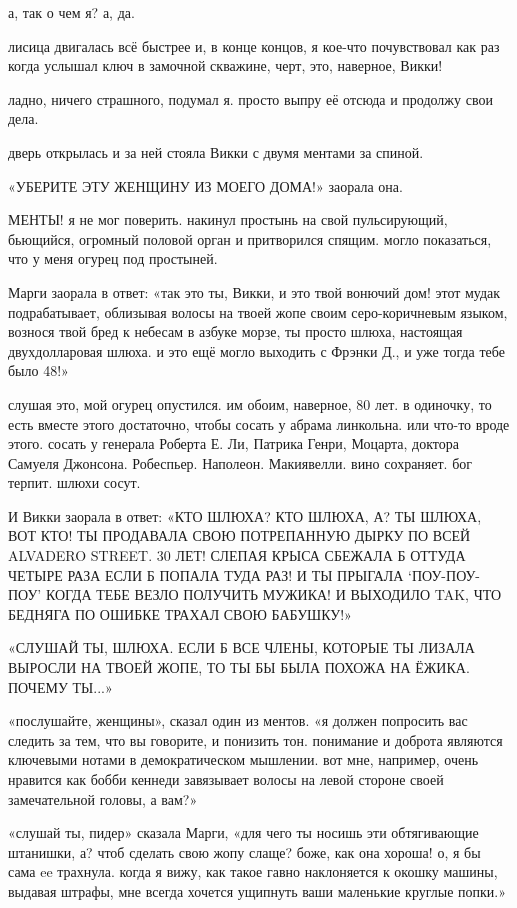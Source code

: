 а, так о чем я? а, да.

лисица двигалась всё быстрее и, в конце концов, я кое-что почувствовал как раз
когда услышал ключ в замочной скважине, черт, это, наверное, Викки!

ладно, ничего страшного, подумал я.
просто выпру её отсюда и продолжу свои дела.

дверь открылась и за ней стояла Викки с двумя ментами за спиной.

«УБЕРИТЕ ЭТУ ЖЕНЩИНУ ИЗ МОЕГО ДОМА!» заорала она.

МЕНТЫ! я не мог поверить.
накинул простынь на свой пульсирующий, бьющийся, 
огромный половой орган и притворился спящим.
могло показаться, что у меня 
огурец под простыней.

Марги заорала в ответ: «так это ты, Викки, и это твой вонючий дом! 
этот мудак подрабатывает, облизывая волосы на твоей жопе своим серо-коричневым 
языком, вознося твой бред к небесам в азбуке морзе, ты просто шлюха, 
настоящая двухдолларовая шлюха.
и это ещё могло выходить с Фрэнки Д., и уже 
тогда тебе было 48!»

слушая это, мой огурец опустился.
им обоим, наверное, 80 лет.
в одиночку, то 
есть вместе этого достаточно, чтобы сосать у абрама линкольна.
или что-то вроде этого.
сосать у генерала Роберта Е.
Ли, Патрика Генри, Моцарта, доктора Самуеля Джонсона.
Робеспьер.
Наполеон.
Макиявелли.
вино сохраняет.
бог терпит.
шлюхи сосут.

И Викки заорала в ответ: «КТО ШЛЮХА? КТО ШЛЮХА, А? ТЫ ШЛЮХА, ВОТ КТО! ТЫ
ПРОДАВАЛА СВОЮ ПОТРЕПАННУЮ ДЫРКУ ПО ВСЕЙ ALVADERO STREET.
30 ЛЕТ! СЛЕПАЯ КРЫСА
СБЕЖАЛА Б ОТТУДА ЧЕТЫРЕ РАЗА ЕСЛИ Б ПОПАЛА ТУДА РАЗ! И ТЫ ПРЫГАЛА `ПОУ-ПОУ-ПОУ'
КОГДА ТЕБЕ ВЕЗЛО ПОЛУЧИТЬ МУЖИКА! И ВЫХОДИЛО TAK, ЧТО БЕДНЯГА ПО ОШИБКЕ ТРАХАЛ СВОЮ БАБУШКУ!»

«СЛУШАЙ ТЫ, ШЛЮХА.
ЕСЛИ Б ВСЕ ЧЛЕНЫ, КОТОРЫЕ ТЫ ЛИЗАЛА ВЫРОСЛИ НА ТВОЕЙ  ЖОПЕ, ТО ТЫ БЫ БЫЛА ПОХОЖА НА ЁЖИКА.
ПОЧЕМУ ТЫ...»

«послушайте, женщины»,  сказал один из ментов.
«я должен попросить вас
следить за тем, что вы говорите, и понизить тон.
понимание и доброта являются 
ключевыми нотами в демократическом мышлении.
вот мне, например, очень нравится
как бобби кеннеди завязывает волосы на левой стороне своей замечательной головы, а вам?»

«слушай ты, пидер» сказала Марги, «для чего ты носишь эти обтягивающие 
штанишки, а? чтоб сделать свою жопу слаще? боже, как она хороша! о, я бы сама ee трахнула.
когда я вижу, как такое гавно наклоняется к окошку 
машины, выдавая штрафы, мне всегда хочется ущипнуть ваши маленькие круглые
попки.»


